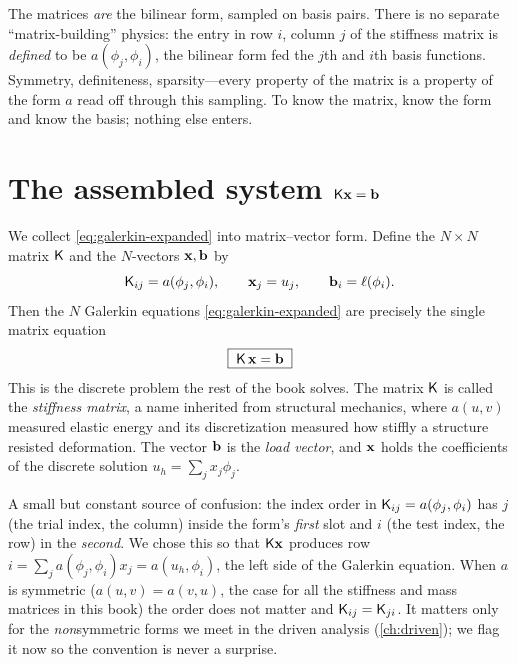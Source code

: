 \begin{keyidea}
The matrices \emph{are} the bilinear form, sampled on basis pairs. There is no
separate ``matrix-building'' physics: the entry in row $i$, column $j$ of the
stiffness matrix is \emph{defined} to be $a(\phi_j,\phi_i)$, the bilinear form
fed the $j$th and $i$th basis functions. Symmetry, definiteness, sparsity---every
property of the matrix is a property of the form $a$ read off through this
sampling. To know the matrix, know the form and know the basis; nothing else
enters.
\end{keyidea}

\section{The assembled system \texorpdfstring{$\mathsf{K}\mathbf{x}=\mathbf{b}$}{Kx=b}}

We collect \cref{eq:galerkin-expanded} into matrix--vector form. Define the
$N\times N$ matrix $\mathsf{K}$ and the $N$-vectors $\mathbf{x},\mathbf{b}$ by
\begin{equation}
\mathsf{K}_{ij}=a(\phi_j,\phi_i),
\qquad
\mathbf{x}_j=u_j,
\qquad
\mathbf{b}_i=\ell(\phi_i).
\label{eq:stiffness-def}
\end{equation}
Then the $N$ Galerkin equations \cref{eq:galerkin-expanded} are precisely the
single matrix equation
\begin{equation}
\boxed{\;\mathsf{K}\,\mathbf{x}=\mathbf{b}\;}
\label{eq:Kxb}
\end{equation}
This is the discrete problem the rest of the book solves. The matrix $\mathsf{K}$ is
called the \emph{stiffness matrix}, a name inherited from structural mechanics,
where $a(u,v)$ measured elastic energy and its discretization measured how stiffly
a structure resisted deformation. The vector $\mathbf{b}$ is the \emph{load vector}, and
$\mathbf{x}$ holds the coefficients of the discrete solution $u_h=\sum_j x_j\phi_j$.

\begin{notationbox}
A small but constant source of confusion: the index order in
$\mathsf{K}_{ij}=a(\phi_j,\phi_i)$ has $j$ (the trial index, the column) inside the
form's \emph{first} slot and $i$ (the test index, the row) in the \emph{second}.
We chose this so that $\mathsf{K}\mathbf{x}$ produces row $i=\sum_j a(\phi_j,\phi_i)x_j
=a(u_h,\phi_i)$, the left side of the Galerkin equation. When $a$ is symmetric
($a(u,v)=a(v,u)$, the case for all the stiffness and mass matrices in this book)
the order does not matter and $\mathsf{K}_{ij}=\mathsf{K}_{ji}$. It matters only for the
\emph{non}symmetric forms we meet in the driven analysis (\cref{ch:driven}); we
flag it now so the convention is never a surprise.
\end{notationbox}

